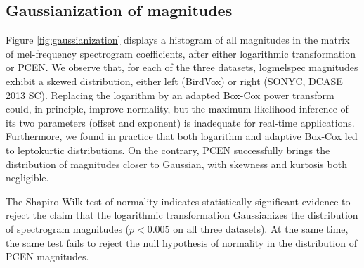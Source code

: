 \documentclass[journal]{IEEEtran}
\theoremstyle{remark}
\begin{document}
\subsection{Gaussianization of magnitudes}\label{sub:gaussianization}
Figure \ref{fig:gaussianization} displays a histogram of all magnitudes in the matrix of mel-frequency spectrogram coefficients, after either logarithmic transformation or PCEN.
We observe that, for each of the three datasets, logmelspec magnitudes exhibit a skewed distribution, either left (BirdVox) or right (SONYC, DCASE 2013 SC).
Replacing the logarithm by an adapted Box-Cox power transform \cite{box1964jrss} could, in principle, improve normality, but the maximum likelihood inference of its two parameters (offset and exponent) is inadequate for real-time applications.
Furthermore, we found in practice that both logarithm and adaptive Box-Cox led to leptokurtic  distributions.
On the contrary, PCEN successfully brings the distribution of magnitudes closer to Gaussian, with skewness and kurtosis both negligible.

The Shapiro-Wilk test of normality indicates statistically significant evidence to reject the claim that the logarithmic transformation Gaussianizes the distribution of spectrogram magnitudes ($p<0.005$ on all three datasets).
At the same time, the same test fails to reject the null hypothesis of normality in the distribution of PCEN magnitudes.
\end{document}
